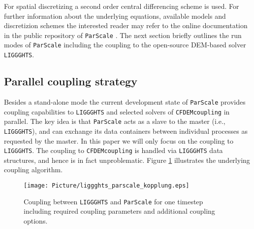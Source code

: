 \documentclass{particles2015}
\begin{document}
For spatial discretizing a second order central differencing scheme is used. For further information about the underlying equations, available models and discretizion schemes the interested reader may refer to the online documentation in the public repository of \texttt{ParScale} \cite{ParScale_Public}. The next section briefly outlines the run modes of \texttt{ParScale} including the coupling to the open-source DEM-based solver \texttt{LIGGGHTS}\textsuperscript{\textregistered}.

\subsection{Parallel coupling strategy}
Besides a stand-alone mode the current development state of \texttt{ParScale} provides coupling capabilities to \texttt{LIGGGHTS}\textsuperscript{\textregistered} and selected solvers of \texttt{CFDEMcoupling} in parallel. The key idea is that \texttt{ParScale} acts as a slave to the master (i.e., \texttt{LIGGGHTS}\textsuperscript{\textregistered}), and can exchange its data containers between individual processes as requested by the master. In this paper we will only focus on the coupling to \texttt{LIGGGHTS}\textsuperscript{\textregistered}. The coupling to \texttt{CFDEMcoupling} is handled via  \texttt{LIGGGHTS}\textsuperscript{\textregistered} data structures, and hence is in fact unproblematic. Figure \ref{fig:Coupling_parScale_LIGGGHTS} illustrates the underlying coupling algorithm.

\begin{figure}[h!]
   \centering
   \texttt{[image: Picture/liggghts\_parscale\_kopplung.eps]}
   \caption{Coupling between \texttt{LIGGGHTS}\textsuperscript{\textregistered} and \texttt{ParScale} for one timestep including required coupling parameters and additional coupling options.}
   \label{fig:Coupling_parScale_LIGGGHTS}
\end{figure}
\end{document}
